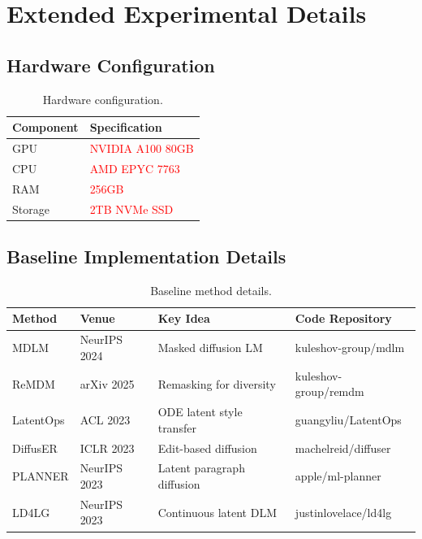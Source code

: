 \documentclass{article}
\newcommand{\tbd}[1]{\textcolor{red}{#1}}
\begin{document}
\section{Extended Experimental Details}
\label{app:exp_details}

\subsection{Hardware Configuration}

\begin{table}[h]
\centering
\caption{Hardware configuration.}
\small
\begin{tabular}{ll}
\toprule
\textbf{Component} & \textbf{Specification} \\
\midrule
GPU & \tbd{NVIDIA A100 80GB} \\
CPU & \tbd{AMD EPYC 7763} \\
RAM & \tbd{256GB} \\
Storage & \tbd{2TB NVMe SSD} \\
\bottomrule
\end{tabular}
\end{table}

\subsection{Baseline Implementation Details}

\begin{table}[h]
\centering
\caption{Baseline method details.}
\small
\begin{tabular}{llll}
\toprule
\textbf{Method} & \textbf{Venue} & \textbf{Key Idea} & \textbf{Code Repository} \\
\midrule
MDLM & NeurIPS 2024 & Masked diffusion LM & kuleshov-group/mdlm \\
ReMDM & arXiv 2025 & Remasking for diversity & kuleshov-group/remdm \\
LatentOps & ACL 2023 & ODE latent style transfer & guangyliu/LatentOps \\
DiffusER & ICLR 2023 & Edit-based diffusion & machelreid/diffuser \\
PLANNER & NeurIPS 2023 & Latent paragraph diffusion & apple/ml-planner \\
LD4LG & NeurIPS 2023 & Continuous latent DLM & justinlovelace/ld4lg \\
\bottomrule
\end{tabular}
\end{table}
\end{document}
